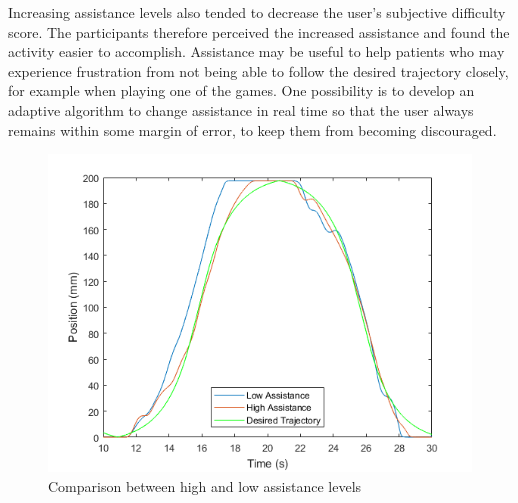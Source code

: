 \documentclass[12pt]{report}
\begin{document}
	Increasing assistance levels also tended to decrease the user's subjective difficulty score. The participants therefore perceived the increased assistance and found the activity easier to accomplish. Assistance may be useful to help patients who may experience frustration from not being able to follow the desired trajectory closely, for example when playing one of the games. One possibility is to develop an adaptive algorithm to change assistance in real time so that the user always remains within some margin of error, to keep them from becoming discouraged. 
 
	
	
	


	


\begin{figure}[h] 
	\centering
	\includegraphics[width=0.9\linewidth]{position_comp}
	\caption{Comparison between high and low assistance levels}
	\label{fig:pos_comp}
\end{figure}
		
\end{document}
